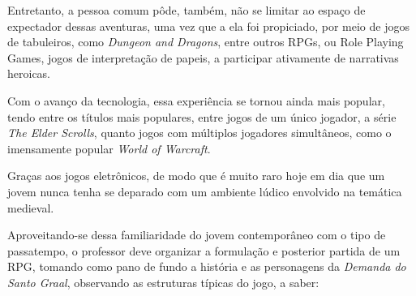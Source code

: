 \documentclass[12pt]{extarticle}
\begin{document}
Entretanto, a pessoa comum pôde, também, não se limitar ao espaço de
expectador dessas aventuras, uma vez que a ela foi propiciado, por meio
de jogos de tabuleiros, como \emph{Dungeon and Dragons}, entre outros
RPGs, ou Role Playing Games, jogos de interpretação de papeis, a
participar ativamente de narrativas heroicas.

Com o avanço da tecnologia, essa experiência se tornou ainda mais
popular, tendo entre os títulos mais populares, entre jogos de um único
jogador, a série \emph{The Elder Scrolls}, quanto jogos com múltiplos
jogadores simultâneos, como o imensamente popular \emph{World of
Warcraft}.

Graças aos jogos eletrônicos, de modo que é muito raro hoje em dia que
um jovem nunca tenha se deparado com um ambiente lúdico envolvido na
temática medieval.

Aproveitando-se dessa familiaridade do jovem contemporâneo com o tipo de
passatempo, o professor deve organizar a formulação e posterior partida
de um RPG, tomando como pano de fundo a história e as personagens da
\emph{Demanda do Santo Graal}, observando as estruturas típicas do jogo,
a saber:
\end{document}
